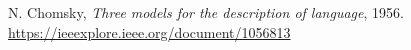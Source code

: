 \begin{thebibliography}{00}

 N. Chomsky, \emph{Three models for the description of language}, 1956. \url{https://ieeexplore.ieee.org/document/1056813}

\end{thebibliography}
